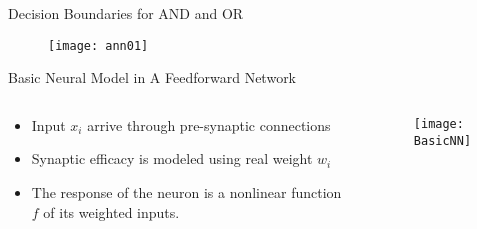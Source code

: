 
\begin{frame}{Decision Boundaries for AND and OR}
\begin{figure}
\texttt{[image: ann01]}
\end{figure}
\end{frame}

\begin{frame}{Basic Neural Model in A Feedforward Network}
\begin{adjustwidth}{-1cm}{-1cm}
\begin{columns}
\begin{column}{5cm}
\begin{itemize}
\item Input $x_i$ arrive through pre-synaptic connections
\item Synaptic efficacy is modeled using real weight $w_i$
\item The response of the neuron is a nonlinear function $f$ of its weighted inputs.
\end{itemize}
\end{column}
\begin{column}{7cm}
\begin{figure}
\texttt{[image: BasicNN]}
\end{figure}
\end{column}
\end{columns}
\end{adjustwidth}
\end{frame}

